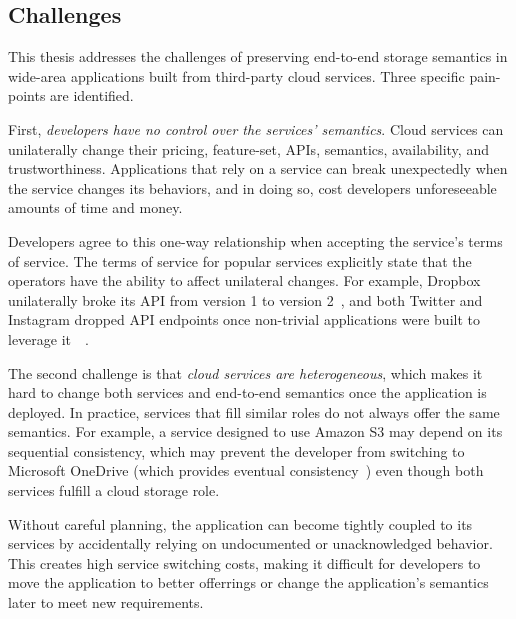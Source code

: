 \subsection{Challenges}

This thesis addresses the challenges of preserving end-to-end storage semantics
in wide-area applications built from third-party cloud services.  Three specific
pain-points are identified.

First, \emph{developers have no control over the services' semantics}.
Cloud services can unilaterally
change their pricing, feature-set, APIs, semantics, availability, and
trustworthiness.  Applications that rely on a service can break unexpectedly
when the service changes its behaviors, and in doing so,
cost developers unforeseeable amounts of time and money.

Developers agree to this one-way relationship when accepting the service's terms of service.  The terms of
service for popular services explicitly state that the operators have the ability to affect unilateral
changes.  For example, Dropbox unilaterally broke its API from version 1 to version
2~\cite{dropbox-v2-api-psa}, and both Twitter and Instagram dropped API
endpoints once non-trivial
applications were built to leverage
it~\cite{twitter-api-deprecation-psa}~\cite{instagram-api-drop}. %

The second challenge is that \emph{cloud services are heterogeneous}, which
makes it hard to change both services and end-to-end semantics once the application is deployed.
In practice, services that fill similar roles do not always offer the same semantics.
For example, a service designed to use Amazon S3 may 
depend on its sequential consistency, which may prevent the developer from
switching to Microsoft OneDrive (which provides eventual
consistency~\cite{consistency-comparison-cloud-storage}) even though both
services fulfill a cloud storage role.   %

Without careful planning, the application can become tightly coupled
to its services by accidentally relying on undocumented or unacknowledged
behavior.  This creates high service switching costs, making it
difficult for developers to move the application to better
offerrings or change the application's semantics later to meet new requirements.

